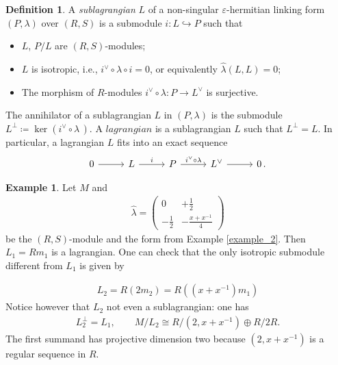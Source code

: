 \documentclass[sn-mathphys-num]{sn-jnl}
\theoremstyle{definition}
\newtheorem{definition}[lemma]{Definition}
\newtheorem{example}[lemma]{Example}
\numberwithin{equation}{section}
\theoremstyle{definition}
\def\ep{\varepsilon}
\def\l{{\lambda}}
\def\hl{{\hat \lambda}}
\def\ker{\operatorname{ker}}
\begin{document}
\begin{definition}\label{def_lagr}
    A \textit{sublagrangian} $L$ of a non-singular $\ep$-hermitian linking form $(P,\l)$ over $(R,S)$ is a submodule $i:L\hookrightarrow P$ such that 
\begin{itemize}
    \item $L$, $P/L$ are $(R,S)$-modules;
    \item  $L$ is isotropic, i.e.,
$i^{\vee}\circ\l\circ i=0$, or equivalently $\hl(L,L)=0$;
    \item The morphism of $R$-modules $i^{\vee}\circ \l :P\to L^{\vee}$ is surjective.
\end{itemize}
The annihilator of a sublagrangian $L$ in $(P,\l)$ is the submodule $L^{\perp}\coloneqq \ker  ( i^{\vee}\circ \l\,)$. A $\textit{lagrangian}$ is a sublagrangian $L$ such that $L^{\perp}=L$. In particular, a lagrangian $L$ fits into an exact sequence 
\begin{align}
\label{eq:lagr_ex_seq}
\begin{tikzcd}[ampersand replacement=\&, column sep=27pt]
	0 \arrow[r] \& L  \arrow[r, "i"] \& P \arrow[r, "i^{\vee}\circ \l"] \& L^{\vee} \arrow[r] \& 0\,.
\end{tikzcd}
\end{align}
\end{definition}
\begin{example}\label{example_3} 
Let $M$ and 
\begin{align}
    \hl = \begin{pmatrix} 0 & +\frac{1}{2}\\ -\frac{1}{2} & -\frac{x+x^{-1}}{4} \end{pmatrix}
\end{align} 
be the $(R,S)$-module and the form from Example \ref{example_2}. Then $L_1=Rm_1$ is a lagrangian. 
One can check that the only isotropic submodule different from $L_1$ is given by 

\begin{align} L_2=R(2m_2)=R((x+x^{-1})m_1) \end{align}
Notice however that $L_2$ not even a sublagrangian: one has \begin{align} L_2^{\perp}=L_1, \qquad M/L_2\cong R/(2,x+x^{-1})\oplus R/2R. \end{align} The first summand has projective dimension two because $(2,x+x^{-1})$ is a regular sequence in $R$. \end{example}
\vspace{3mm}
\end{document}
